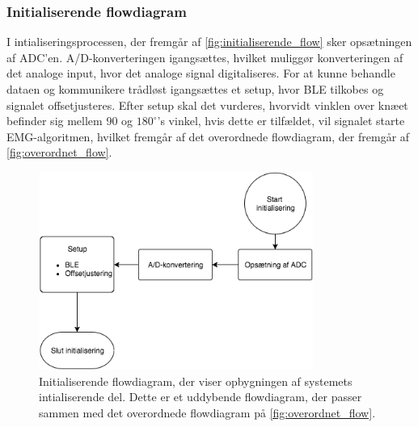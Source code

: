 \subsubsection{Initialiserende flowdiagram}
I intialiseringsprocessen, der fremgår af \autoref{fig:initialiserende_flow} sker opsætningen af ADC'en. A/D-konverteringen igangsættes, hvilket muliggør konverteringen af det analoge input, hvor det analoge signal digitaliseres. For at kunne behandle dataen og kommunikere trådløst igangsættes et setup, hvor BLE tilkobes og signalet offsetjusteres. Efter setup skal det vurderes, hvorvidt vinklen over knæet befinder sig mellem 90 og $180^{\circ}$'s vinkel, hvis dette er tilfældet, vil signalet starte EMG-algoritmen, hvilket fremgår af det overordnede flowdiagram, der fremgår af \autoref{fig:overordnet_flow}. 
\begin{figure}[H]
\centering
\includegraphics[width=0.8\textwidth]{figures/implementering/initialiserende_flow.png}
\caption{Initialiserende flowdiagram, der viser opbygningen af systemets intialiserende del. Dette er et uddybende flowdiagram, der passer sammen med det overordnede flowdiagram på \autoref{fig:overordnet_flow}.}
\label{fig:initialiserende_flow}
\end{figure}

